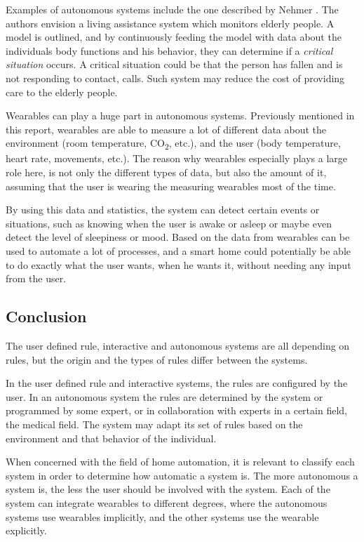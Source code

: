 Examples of autonomous systems include the one described by Nehmer \etal \cite{nehmer2006living}. 
The authors envision a living assistance system which monitors elderly people. 
A model is outlined, 
and by continuously feeding the model with data about the individuals body functions and his behavior, 
they can determine if a \emph{critical situation} occurs. 
A critical situation could be that the person has fallen and is not responding to contact, \eg calls.
Such system may reduce the cost of providing care to the elderly people.

Wearables can play a huge part in autonomous systems. 
Previously mentioned in this report, 
wearables are able to measure a lot of different data about the environment (room temperature, CO\textsubscript{2}, etc.), 
and the user (body temperature, heart rate, movements, etc.). 
The reason why wearables especially plays a large role here, 
is not only the different types of data, but also the amount of it,
assuming that the user is wearing the measuring wearables most of the time. 

By using this data and statistics, the system can detect certain events or situations, 
such as knowing when the user is awake or asleep or maybe even detect the level of sleepiness or mood.    
Based on the data from wearables can be used to automate a lot of processes, 
and a smart home could potentially be able to do exactly what the user wants, 
when he wants it, without needing any input from the user. 

\subsection{Conclusion}

The user defined rule, interactive and autonomous systems are all depending on rules, 
but the origin and the types of rules differ between the systems. 

In the user defined rule and interactive systems, the rules are configured by the user.
In an autonomous system the rules are determined by the system or programmed by some expert, 
or in collaboration with experts in a certain field, \eg the medical field. 
The system may adapt its set of rules based on the environment and that behavior of the individual.

When concerned with the field of home automation, 
it is relevant to classify each system in order to determine how automatic a system is. 
The more autonomous a system is, 
the less the user should be involved with the system.
Each of the system can integrate wearables to different degrees, 
where the autonomous systems use wearables implicitly, 
and the other systems use the wearable explicitly.  

